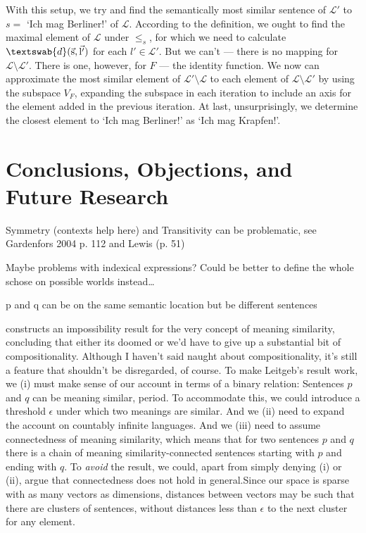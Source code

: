 \documentclass[11pt, a4paper]{scrartcl}
\renewcommand{\i}[1]{\emph{#1}}
\renewcommand{\L}{\mathcal{L}}
\renewcommand{\v}[1]{\vec{\mathrm{#1}}}
\newcommand{\m}[1]{\textswab{#1}}
\begin{document}
With this setup, we try and find the semantically most similar sentence of $\L'$ to $s =$ `Ich mag Berliner!' of $\L$. According to the definition, we ought to find the maximal element of $\L$ under $\leqslant_s$, for which we need to calculate $\m{d}(\v{s},\v{l'})$ for each $l' \in \L'$. But we can't --- there is no mapping for $\L\setminus\L'$. There is one, however, for $F$ --- the identity function. We now can approximate the most similar element of $\L'\setminus\L$ to each element of $\L\setminus\L'$ by using the subspace $V_F$, expanding the subspace in each iteration to include an axis for the element added in the previous iteration. At last, unsurprisingly, we determine the closest element to `Ich mag Berliner!' as `Ich mag Krapfen!'. 

\section{Conclusions, Objections, and Future Research}

Symmetry (contexts help here) and Transitivity can be problematic, see Gardenfors 2004 p. 112 and Lewis (p. 51)

Maybe problems with indexical expressions? Could be better to define the whole schose on possible worlds instead\ldots

p and q can be on the same semantic location but be different sentences

\textcite{Leitgeb2008-LEIAIR} constructs an impossibility result for the very concept of meaning similarity, concluding that either its doomed or we'd have to give up a substantial bit of compositionality. Although I haven't said naught about compositionality, it's still a feature that shouldn't be disregarded, of course. To make Leitgeb's result work, we (i) must make sense of our account in terms of a binary relation: Sentences $p$ and $q$ can be meaning similar, period. To accommodate this, we could introduce a threshold $\epsilon$ under which two meanings are similar. And we (ii) need to expand the account on countably infinite languages. And we (iii) need to assume connectedness of meaning similarity, which means that for two sentences $p$ and $q$ there is a chain of meaning similarity-connected sentences starting with $p$ and ending with $q$. To \i{avoid} the result, we could, apart from simply denying (i) or (ii), argue that connectedness does not hold in general.Since our space is sparse with as many vectors as dimensions, distances between vectors may be such that there are clusters of sentences, without distances less than $\epsilon$ to the next cluster for any element.
\end{document}
